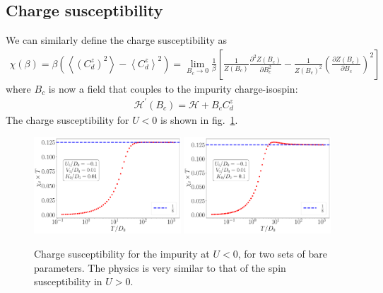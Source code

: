 \documentclass{report}
\numberwithin{equation}{section}
\begin{document}
\subsection{Charge susceptibility}
We can similarly define the charge susceptibility as
\begin{equation}\begin{aligned}
	\label{zero_chi_charge}
	\chi(\beta) = \beta \left(\left<\left(C_d^z\right)^2\right> - \left<C_d^z\right>^2\right) = \lim_{B_c \to 0}\frac{1}{\beta}\left[\frac{1}{Z(B_c)} \frac{\partial^2{Z(B_c)}}{\partial{B_c^2}}-\frac{1}{Z(B_c)^2} \left(\frac{\partial{Z(B_c)}}{\partial{B_c}}\right)^2\right]
\end{aligned}\end{equation}
where \(B_c\) is now a field that couples to the impurity charge-isospin:
\begin{equation}\begin{aligned}
	\label{charge_field}
	\mathcal{H}^\prime(B_c) = \mathcal{H} + B_c C_d^z
\end{aligned}\end{equation}
The charge susceptibility for \(U<0\) is shown in fig.~\ref{chi_charge}.
\begin{figure}[htpb]
	\centering
	\includegraphics[width=0.49\textwidth]{../figures/chi_chargeT_K=0.010.pdf}
	\includegraphics[width=0.49\textwidth]{../figures/chi_chargeT_K=0.100.pdf}
	\caption{Charge susceptibility for the impurity at \(U<0\), for two sets of bare parameters. The physics is very similar to that of the spin susceptibility in \(U>0\).}
	\label{chi_charge}
\end{figure}
\end{document}
